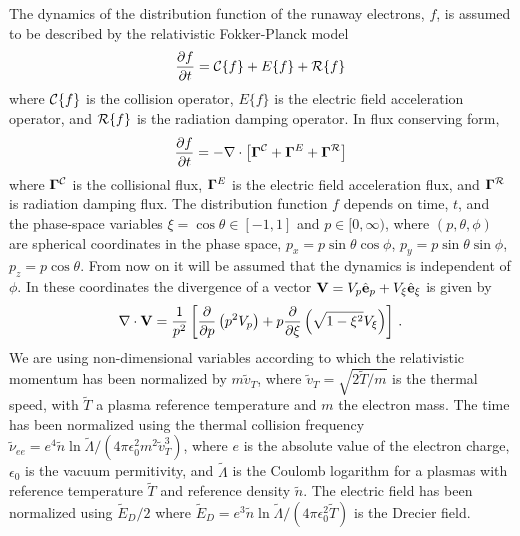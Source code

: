 \documentclass[preprint,11pt]{elsarticle}
\newcommand{\bq}{\begin{equation}}
\newcommand{\eq}{\end{equation}}
\begin{document}
The dynamics of the distribution function of the runaway electrons,  $f$, is assumed to be described by the relativistic Fokker-Planck model
\bq
\frac{\partial f}{\partial t}=  {\cal C} \{ f \} +E\{f\} + {\cal R}\{f\}
\eq
where ${\cal C} \{ f \}$ is the collision operator, $E\{f\}$ is the electric field acceleration operator, and ${\cal R}\{f\}$ is the radiation damping operator. 
In flux conserving form, 
\bq
\frac{\partial f}{\partial t}= - \nabla \cdot \left [ {\bf \Gamma}^{\cal C}+ {\bf \Gamma}^E+ {\bf \Gamma}^{\cal R}\right] 
\eq
where 
${\bf \Gamma}^{\cal C}$  is the collisional flux, ${\bf \Gamma}^E$ is the electric field acceleration flux, and  ${\bf \Gamma}^{\cal R}$ is radiation damping flux. The distribution function $f$ depends on time, $t$, and the phase-space variables $\xi=\cos \theta \in [-1,1]$ and $p\in [0, \infty)$, where $(p,\theta,\phi)$ are spherical coordinates in the phase space, $p_x= p \sin \theta \cos \phi$, $p_y= p \sin \theta \sin \phi$, $p_z= p \cos \theta$.  From now on it will be assumed that the dynamics is independent of $\phi$. In these  coordinates the divergence of  a vector ${\bf V}=V_p \hat {\bf e}_p+V_\xi \hat {\bf e}_\xi$ is given by
\bq
\nabla \cdot {\bf V}=\frac{1}{p^2}\left[ \frac{\partial }{\partial p} \left( p^2 V_p\right) 
+ p  \frac{\partial }{\partial \xi} \left( \sqrt{1-\xi^2}  V_\xi \right) 
\right ] \, .
\eq
We are using non-dimensional variables according to which the relativistic momentum has been normalized by $m \tilde{v}_T$, where $\tilde{v}_T=\sqrt{2 \tilde{T}/m}$ is the thermal speed, with $\tilde{T}$ a plasma reference temperature and $m$ the electron mass. The time has been normalized using the thermal collision frequency 
$\tilde{\nu}_{ee}=e^4 \tilde{n}\ln \tilde{\Lambda}/(4 \pi \epsilon_0^2 m^2 \tilde{v}_T^3)$, where $e$ is the absolute value of the electron charge, $\epsilon_0$ is the vacuum permitivity, and $\tilde{\Lambda}$ is the Coulomb logarithm for a plasmas with reference temperature $\tilde{T}$ and reference density $\tilde{n}$. The electric field has been normalized using $\tilde{E}_D/2$ where $\tilde{E}_D= e^3 \tilde{n}\ln \tilde{\Lambda}/(4 \pi \epsilon_0^2 \tilde{T})$ is the Drecier field.
\end{document}
